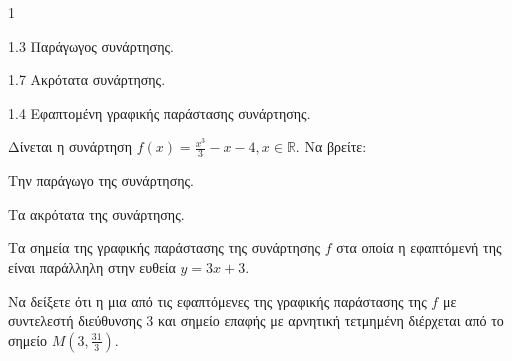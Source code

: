 \begin{ylh}{1}
    \item 1.3 Παράγωγος συνάρτησης.
    \item 1.7 Ακρότατα συνάρτησης.
    \item 1.4 Εφαπτομένη γραφικής παράστασης συνάρτησης.
\end{ylh}
Δίνεται η συνάρτηση $f(x) = \frac{x^3}{3} - x - 4, x \in \mathbb{R}$. Να βρείτε:
\begin{alist}
    \item Την παράγωγο της συνάρτησης. 
    \item Τα ακρότατα της συνάρτησης. 
    \item
    \begin{rlist}
        \item Τα σημεία της γραφικής παράστασης της συνάρτησης $f$ στα οποία η εφαπτόμενή της είναι παράλληλη στην ευθεία $y=3x+3$. 
        \item Να δείξετε ότι η μια από τις εφαπτόμενες της γραφικής παράστασης της $f$ με συντελεστή διεύθυνσης 3 και σημείο επαφής με αρνητική τετμημένη διέρχεται από το σημείο $M\left(3, \frac{31}{3}\right)$. 
    \end{rlist}
\end{alist}

